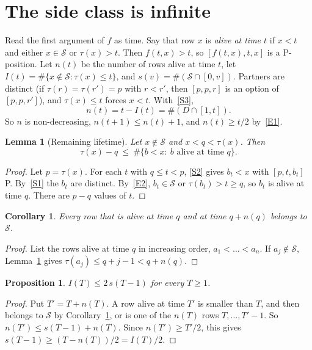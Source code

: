 \documentclass[11pt]{amsart}
\newtheorem{corollary}[theorem]{Corollary}
\newtheorem{lemma}[theorem]{Lemma}
\newtheorem{proposition}[theorem]{Proposition}
\theoremstyle{definition}
\theoremstyle{remark}
\newcommand{\Sc}{\mathcal{S}}
\begin{document}
\section{The side class is infinite}\label{sec:side}

Read the first argument of $f$ as time. Say that row $x$ is \emph{alive at time $t$} if $x<t$
and either $x\in\Sc$ or $\tau(x)>t$. Then $f(t,x)>t$, so $[f(t,x),t,x]$ is a P-position. Let
$n(t)$ be the number of rows alive at time $t$, let $I(t)=\#\{x\notin\Sc:\tau(x)\le t\}$, and
$s(v)=\#(\Sc\cap[0,v])$. Partners are distinct (if $\tau(r)=\tau(r')=p$ with $r<r'$, then
$[p,p,r]$ is an option of $[p,p,r']$), and $\tau(x)\le t$ forces $x<t$. With~\ref{S3},
\begin{equation}\label{eq:I}
n(t)=t-I(t)=\#(D\cap[1,t]).
\end{equation}
So $n$ is non-decreasing, $n(t+1)\le n(t)+1$, and $n(t)\ge t/2$ by~\ref{E1}.

\begin{lemma}[Remaining lifetime]\label{lem:life}
Let $x\notin\Sc$ and $x<q<\tau(x)$. Then
\[
\tau(x)-q\ \le\ \#\{b<x:\ b\text{ alive at time }q\}.
\]
\end{lemma}
\begin{proof}
Let $p=\tau(x)$. For each $t$ with $q\le t<p$, \ref{S2} gives $b_t<x$ with $[p,t,b_t]$ P.
By~\ref{S1} the $b_t$ are distinct. By~\ref{E2}, $b_t\in\Sc$ or $\tau(b_t)>t\ge q$, so $b_t$ is
alive at time $q$. There are $p-q$ values of $t$.
\end{proof}

\begin{corollary}\label{cor:oldest}
Every row that is alive at time $q$ and at time $q+n(q)$ belongs to $\Sc$.
\end{corollary}
\begin{proof}
List the rows alive at time $q$ in increasing order, $a_1<\dots<a_n$. If $a_j\notin\Sc$,
Lemma~\ref{lem:life} gives $\tau(a_j)\le q+j-1<q+n(q)$.
\end{proof}

\begin{proposition}\label{prop:half}
$I(T)\le 2\,s(T-1)$ for every $T\ge1$.
\end{proposition}
\begin{proof}
Put $T'=T+n(T)$. A row alive at time $T'$ is smaller than $T$, and then belongs to $\Sc$ by
Corollary~\ref{cor:oldest}, or is one of the $n(T)$ rows $T,\dots,T'-1$. So
$n(T')\le s(T-1)+n(T)$. Since $n(T')\ge T'/2$, this gives $s(T-1)\ge(T-n(T))/2=I(T)/2$.
\end{proof}
\end{document}

